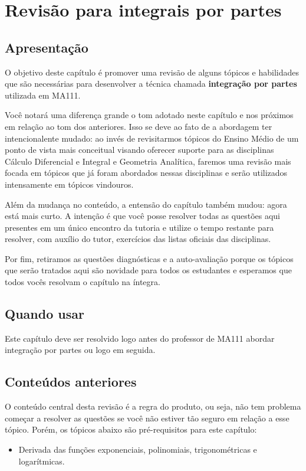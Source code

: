 \documentclass[main_estudante.tex]{subfiles}
\begin{document}
\chapter{Revisão para integrais por partes}

\section{Apresentação}

O objetivo deste capítulo é promover uma revisão de alguns tópicos e habilidades que são necessárias para desenvolver a técnica chamada \textbf{integração por partes} utilizada em MA111.

Você notará uma diferença grande o tom adotado neste capítulo e nos próximos em relação ao tom dos anteriores. Isso se deve ao fato de a abordagem ter intencionalente mudado: ao invés de revisitarmos tópicos do Ensino Médio de um ponto de vista mais conceitual visando oferecer suporte para as disciplinas Cálculo Diferencial e Integral e Geometria Analítica, faremos uma revisão mais focada em tópicos que já foram abordados nessas disciplinas e serão utilizados intensamente em tópicos vindouros.

Além da mudança no conteúdo, a entensão do capítulo também mudou: agora está mais curto. A intenção é que você posse resolver todas as questões aqui presentes em um único encontro da tutoria e utilize o tempo restante para resolver, com auxílio do tutor, exercícios das listas oficiais das disciplinas.

Por fim, retiramos as questões diagnósticas e a auto-avaliação porque os tópicos que serão tratados aqui são novidade para todos os estudantes e esperamos que todos vocês resolvam o capítulo na íntegra.

\section{Quando usar}

Este capítulo deve ser resolvido logo antes do professor de MA111 abordar integração por partes ou logo em seguida.

\section{Conteúdos anteriores}

O conteúdo central desta revisão é a regra do produto, ou seja, não tem problema começar a resolver as questões se você não estiver tão seguro em relação a esse tópico. Porém, os tópicos abaixo são pré-requisitos para este capítulo:
\begin{itemize}
 \item Derivada das funções exponenciais, polinomiais, trigonométricas e logarítmicas.
\end{itemize}
\end{document}
